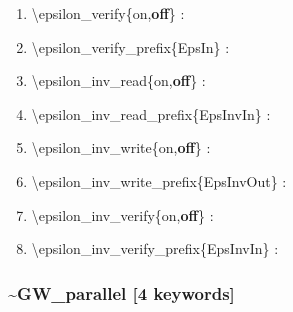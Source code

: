 \documentclass[letterpaper,12pt]{article}
\newcommand{\note}[1]{{\bf \large \color{red} #1}}
\begin{document}
\begin{enumerate}
 \vspace{0.15in}
 \item   \textbackslash{}epsilon\_verify\{on,{\bf off}\} : \\
 
\vspace{0.15in}
 \item   \textbackslash{}epsilon\_verify\_prefix\{EpsIn\} : \\
 
  \vspace{0.15in}
 \item   \textbackslash{}epsilon\_inv\_read\{on,{\bf off}\} : \\
 
\vspace{0.15in}
 \item   \textbackslash{}epsilon\_inv\_read\_prefix\{EpsInvIn\} : \\

 \vspace{0.15in}
 \item   \textbackslash{}epsilon\_inv\_write\{on,{\bf off}\} : \\
 
\vspace{0.15in}
 \item   \textbackslash{}epsilon\_inv\_write\_prefix\{EpsInvOut\} : \\

 \vspace{0.15in}
 \item   \textbackslash{}epsilon\_inv\_verify\{on,{\bf off}\} : \\
 
\vspace{0.15in}
 \item   \textbackslash{}epsilon\_inv\_verify\_prefix\{EpsInvIn\} : \\

\end{enumerate}

\newpage
\subsubsection*{\bf \~{}GW\_parallel [4 keywords]}

\end{document}
